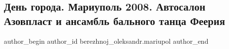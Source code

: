  
 
 
 
 

\subsection{День города. Мариуполь 2008. Автосалон Азовпласт и ансамбль бального танца Феерия}
\label{sec:24_03_2020.fb.berezhnoj_oleksandr.mariupol.1.den_goroda__mariupol}

\ifcmt
 author_begin
   author_id berezhnoj_oleksandr.mariupol
 author_end
\fi
